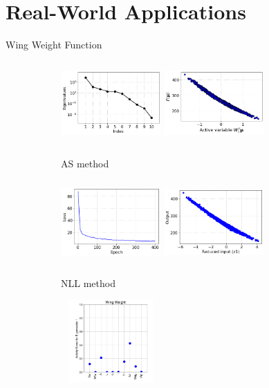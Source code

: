 \documentclass[10pt]{beamer}
\begin{document}
\section{Real-World Applications}
\begin{frame}{Wing Weight Function}

\begin{figure}
\begin{subfigure}{0.3\textwidth}
    \includegraphics[height=1.25in,width=1.5in]{images/wingeigen.png}
    \includegraphics[height=1.25in,width=1.5in]{images/wingas.png}
    \caption{AS method}
\end{subfigure}
\hfill
\begin{subfigure}{0.3\textwidth}
    \includegraphics[height=1.25in,width=1.5in]{images/wingloss.png}
    \includegraphics[height=1.25in,width=1.5in]{images/wingnll2.png}
    \caption{NLL method}
\end{subfigure}
\hfill
\begin{subfigure}{0.3\textwidth}
    \includegraphics[height=1.25in,width=1.5in]{images/WingEC.png}

\end{subfigure}
\end{figure}
\end{frame}
\end{document}
